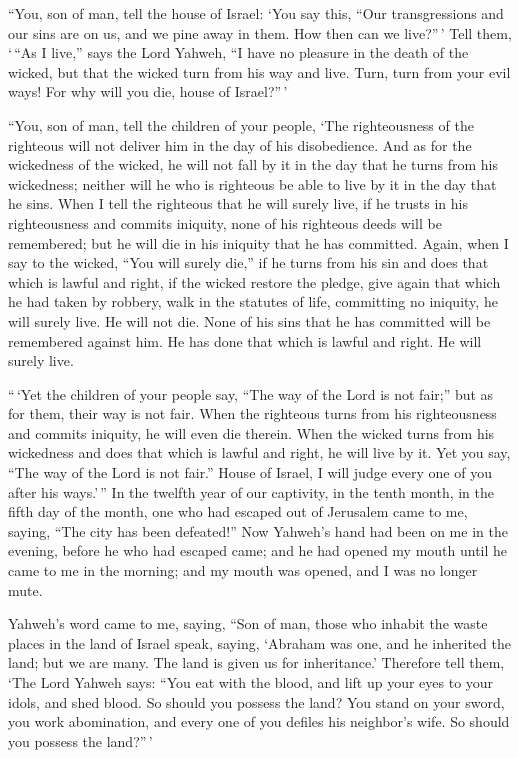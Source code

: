  ``You, son of man, tell the house of Israel: `You say
this, ``Our transgressions and our sins are on us, and we pine away in
them. How then can we live?''\,'  Tell them, `\,``As I
live,'' says the Lord Yahweh, ``I have no pleasure in the death of the
wicked, but that the wicked turn from his way and live. Turn, turn from
your evil ways! For why will you die, house of Israel?''\,'

 ``You, son of man, tell the children of your people, `The
righteousness of the righteous will not deliver him in the day of his
disobedience. And as for the wickedness of the wicked, he will not fall
by it in the day that he turns from his wickedness; neither will he who
is righteous be able to live by it in the day that he sins.
 When I tell the righteous that he will surely live, if he
trusts in his righteousness and commits iniquity, none of his righteous
deeds will be remembered; but he will die in his iniquity that he has
committed.  Again, when I say to the wicked, ``You will
surely die,'' if he turns from his sin and does that which is lawful and
right,  if the wicked restore the pledge, give again that
which he had taken by robbery, walk in the statutes of life, committing
no iniquity, he will surely live. He will not die.  None of
his sins that he has committed will be remembered against him. He has
done that which is lawful and right. He will surely live.

 ``\,`Yet the children of your people say, ``The way of the
Lord is not fair;'' but as for them, their way is not fair.
 When the righteous turns from his righteousness and
commits iniquity, he will even die therein.  When the
wicked turns from his wickedness and does that which is lawful and
right, he will live by it.  Yet you say, ``The way of the
Lord is not fair.'' House of Israel, I will judge every one of you after
his ways.'\,''  In the twelfth year of our captivity, in
the tenth month, in the fifth day of the month, one who had escaped out
of Jerusalem came to me, saying, ``The city has been defeated!''
 Now Yahweh's hand had been on me in the evening, before he
who had escaped came; and he had opened my mouth until he came to me in
the morning; and my mouth was opened, and I was no longer mute.

 Yahweh's word came to me, saying,  ``Son of
man, those who inhabit the waste places in the land of Israel speak,
saying, `Abraham was one, and he inherited the land; but we are many.
The land is given us for inheritance.'  Therefore tell
them, `The Lord Yahweh says: ``You eat with the blood, and lift up your
eyes to your idols, and shed blood. So should you possess the land?
 You stand on your sword, you work abomination, and every
one of you defiles his neighbor's wife. So should you possess the
land?''\,'

